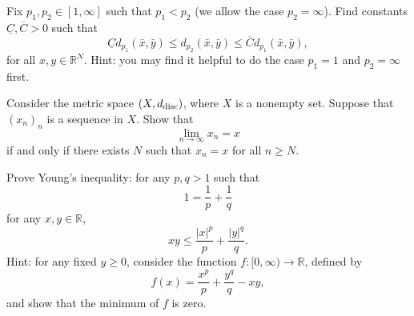 \documentclass[11pt,letterpaper]{article}
\newcommand{\R}{\mathbb{R}}
\newenvironment{prob}[1]
  {\renewcommand\theinnerprob{#1}\innerprob}
  {\endinnerprob}
\newenvironment{solution}
  {\renewcommand\qedsymbol{}\begin{proof}[Solution]}
  {\end{proof}\bigskip}
\begin{document}
\begin{prob}{2}  %
Fix $p_1,p_2 \in [1,\infty]$ such that $p_1 < p_2$ (we allow the case $p_2 = \infty$).  Find constants $\underline C, \overline C >0$ such that
\[
	\underline C d_{p_1}(\bar x, \bar y)
		\leq d_{p_2}(\bar x, \bar y)
		\leq \overline C d_{p_1}(\bar x, \bar y),
\]
for all $x,y \in \R^N$.  Hint: you may find it helpful to do the case $p_1 = 1$ and $p_2=\infty$ first.
\end{prob}






\begin{prob}{3}  %
Consider the metric space $(X, d_{\rm disc})$, where $X$ is a nonempty set.  Suppose that $(x_n)_n$ is a sequence in $X$.  Show that
\[
	\lim_{n\to\infty} x_n = x
\]
if and only if there exists $N$ such that $x_n = x$ for all $n \geq N$.
\end{prob}



\begin{prob}{4}  %
Prove Young's inequality: for any $p,q >1$ such that
\[
	1
		= \frac{1}{p} + \frac{1}{q}
\]
for any $x,y\in \R$,
\[
	xy \leq \frac{|x|^p}{p} + \frac{|y|^q}{q}.
\]
Hint: for any fixed $y \geq 0$, consider the function $f: [0,\infty) \to \R$, defined by
\[
	f(x) = \frac{x^p}{p} + \frac{y^q}{q} - xy,
\]
and show that the minimum of $f$ is zero.
\end{prob}
\end{document}
